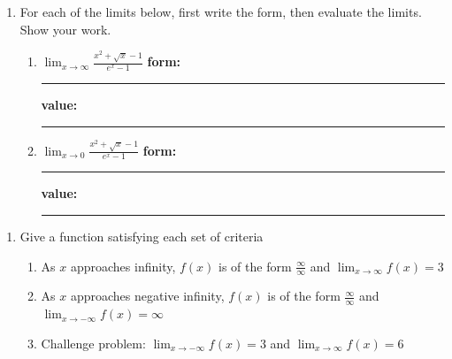 \documentclass[10pt]{article}
\begin{document}
\begin{enumerate}
\item[2.]\reversemarginpar{} For each of the limits below, first write the form, then evaluate the limits. Show your work.
    \begin{enumerate}
    \item[(a)] $\displaystyle\lim_{x\to\infty}\frac{x^2+\sqrt{x}-1}{e^x-1}$ \hfill {\bf form:}\rule[-8pt]{0.5in}{0.4pt} \hfill {\bf value:}\rule[-8pt]{0.5in}{0.4pt}
        \vfill

    \item[(b)] $\displaystyle\lim_{x\to0}\frac{x^2+\sqrt{x}-1}{e^x-1}$ \hfill {\bf form:}\rule[-8pt]{0.5in}{0.4pt} \hfill {\bf value:}\rule[-8pt]{0.5in}{0.4pt}
        \vfill
    \end{enumerate}
\end{enumerate}

\begin{enumerate}
\item[3.]\reversemarginpar{} Give a function satisfying each set of criteria
    \begin{enumerate}
    \item[(a)] As $x$ approaches infinity, $f(x)$ is of the form $\frac \infty \infty$ and $\lim_{x\to \infty}f(x) = 3$
        \vfill

    \item[(b)] As $x$ approaches negative infinity, $f(x)$ is of the form $\frac \infty \infty$ and $\lim_{x\to -\infty}f(x) = \infty$ 
        \vfill

    \item[(c)] Challenge problem: $\lim_{x\to -\infty}f(x) = 3$ and $\lim_{x\to \infty}f(x) = 6$ 
        \vfill
    \end{enumerate}
\end{enumerate}
\end{document}
